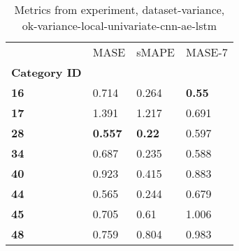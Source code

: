 \begin{table}[H]
\centering
\caption{Metrics from experiment, dataset-variance, ok-variance-local-univariate-cnn-ae-lstm}
\label{table:ok-variance-local-univariate-cnn-ae-lstm-dataset-variance}
\begin{tabular}{llll}
\toprule
{} &            MASE &          sMAPE &         MASE-7 \\
\textbf{Category ID} &                 &                &                \\
\midrule
\textbf{16         } &           0.714 &          0.264 &  \textbf{0.55} \\
\textbf{17         } &           1.391 &          1.217 &          0.691 \\
\textbf{28         } &  \textbf{0.557} &  \textbf{0.22} &          0.597 \\
\textbf{34         } &           0.687 &          0.235 &          0.588 \\
\textbf{40         } &           0.923 &          0.415 &          0.883 \\
\textbf{44         } &           0.565 &          0.244 &          0.679 \\
\textbf{45         } &           0.705 &           0.61 &          1.006 \\
\textbf{48         } &           0.759 &          0.804 &          0.983 \\
\bottomrule
\end{tabular}
\end{table}
